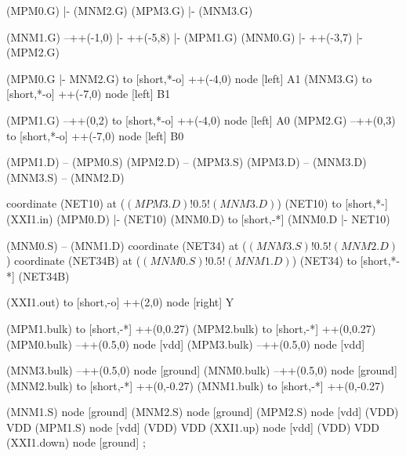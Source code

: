 \begin{circuitikz}[american]
	
	(MPM0.G) |- (MNM2.G)
	(MPM3.G) |- (MNM3.G)
	
	(MNM1.G) --++(-1,0) |- ++(-5,8) |- (MPM1.G)
	(MNM0.G) |- ++(-3,7) |- (MPM2.G)
	
	(MPM0.G |- MNM2.G) to [short,*-o] ++(-4,0) node [left] {A1}
	(MNM3.G) to [short,*-o] ++(-7,0) node [left] {B1}
	
	(MPM1.G) --++(0,2) to [short,*-o] ++(-4,0) node [left] {A0}
	(MPM2.G) --++(0,3) to [short,*-o] ++(-7,0) node [left] {B0}
	
	(MPM1.D) -- (MPM0.S)
	(MPM2.D) -- (MPM3.S)
	(MPM3.D) -- (MNM3.D)
	(MNM3.S) -- (MNM2.D)
	
	coordinate (NET10) at ($(MPM3.D)!0.5!(MNM3.D)$)
	(NET10) to [short,*-] (XXI1.in)
	(MPM0.D) |- (NET10)
	(MNM0.D) to [short,-*] (MNM0.D |- NET10)
	
	(MNM0.S) -- (MNM1.D)
	coordinate (NET34) at ($(MNM3.S)!0.5!(MNM2.D)$)
	coordinate (NET34B) at ($(MNM0.S)!0.5!(MNM1.D)$)
	(NET34) to [short,*-*] (NET34B)
	
	(XXI1.out) to [short,-o] ++(2,0) node [right] {Y}
	
	(MPM1.bulk) to [short,-*] ++(0,0.27)
	(MPM2.bulk) to [short,-*] ++(0,0.27)	
	(MPM0.bulk) --++(0.5,0) node [vdd]{}
	(MPM3.bulk) --++(0.5,0) node [vdd]{}
	
	(MNM3.bulk) --++(0.5,0) node [ground]{}
	(MNM0.bulk) --++(0.5,0) node [ground]{}
	(MNM2.bulk) to [short,-*] ++(0,-0.27)
	(MNM1.bulk) to [short,-*] ++(0,-0.27)


	(MNM1.S) node [ground] {}
	(MNM2.S) node [ground] {}
	(MPM2.S) node [vdd] (VDD) {VDD}
	(MPM1.S) node [vdd] (VDD) {VDD}
	(XXI1.up) node [vdd] (VDD) {VDD}
	(XXI1.down) node [ground] {}
;

\end{circuitikz}

